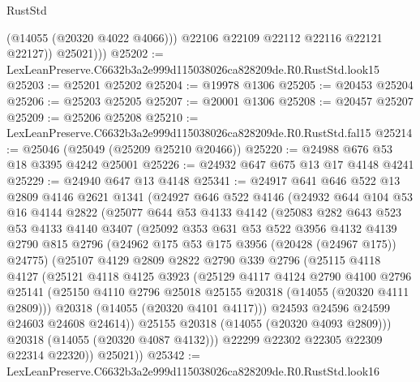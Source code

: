 \begin{lexlean}{RustStd}
\begin{coremodule}
                (@14055 (@20320 @4022 @4066)))
              @22106
              @22109
              @22112
              @22116
              @22121
              @22127))
          @25021)))
@25202 := LexLeanPreserve.C6632b3a2e999d115038026ca828209de.R0.RustStd.look15
@25203 := @25201 @25202
@25204 := @19978 @1306
@25205 := @20453 @25204
@25206 := @25203 @25205
@25207 := @20001 @1306
@25208 := @20457 @25207
@25209 := @25206 @25208
@25210 := LexLeanPreserve.C6632b3a2e999d115038026ca828209de.R0.RustStd.fal15
@25214 := @25046 (@25049 (@25209 @25210 @20466))
@25220 := @24988 @676 @53 @18 @3395 @4242 @25001
@25226 := @24932 @647 @675 @13 @17 @4148 @4241
@25229 := @24940 @647 @13 @4148
@25341 := @24917
    @641
    @646
    @522
    @13
    @2809
    @4146
    @2621
    @1341
    (@24927
      @646
      @522
      @4146
      (@24932
        @644
        @104
        @53
        @16
        @4144
        @2822
        (@25077
          @644
          @53
          @4133
          @4142
          (@25083
            @282
            @643
            @523
            @53
            @4133
            @4140
            @3407
            (@25092
              @353
              @631
              @53
              @522
              @3956
              @4132
              @4139
              @2790
              @815
              @2796
              (@24962 @175 @53 @175 @3956 (@20428 (@24967 @175)) @24775)
              (@25107
                @4129
                @2809
                @2822
                @2790
                @339
                @2796
                (@25115
                  @4118
                  @4127
                  (@25121
                    @4118
                    @4125
                    @3923
                    (@25129
                      @4117
                      @4124
                      @2790
                      @4100
                      @2796
                      @25141
                      (@25150 @4110 @2796 @25018 @25155 @20318 (@14055 (@20320 @4111 @2809)))
                      @20318
                      (@14055 (@20320 @4101 @4117)))
                    @24593
                    @24596
                    @24599
                    @24603
                    @24608
                    @24614))
                @25155
                @20318
                (@14055 (@20320 @4093 @2809)))
              @20318
              (@14055 (@20320 @4087 @4132)))
            @22299
            @22302
            @22305
            @22309
            @22314
            @22320))
        @25021))
@25342 := LexLeanPreserve.C6632b3a2e999d115038026ca828209de.R0.RustStd.look16

\end{coremodule}
\end{lexlean}
